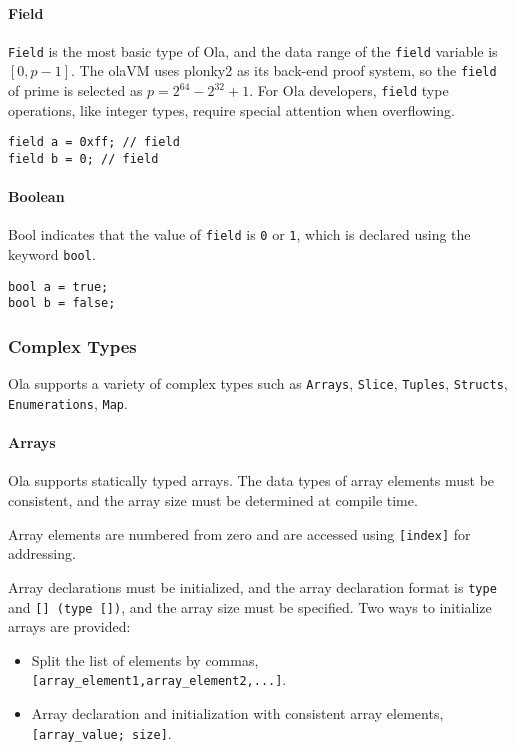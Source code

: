 \paragraph{Field}
\texttt{Field} is the most basic type of Ola, and the data range of the \texttt{field} variable is $[0, p-1]$.
The olaVM uses plonky2 as its back-end proof system, so the \texttt{field} of prime is selected as $p=2^{64}-2^{32}+1$. 
For Ola developers, \texttt{field} type operations, like integer types, require special attention when overflowing.

\begin{lstlisting}
field a = 0xff; // field
field b = 0; // field
\end{lstlisting}

\paragraph{Boolean}

Bool indicates that the value of \texttt{field} is \texttt{0} or \texttt{1}, which is declared using the keyword \texttt{bool}.
\begin{lstlisting}
bool a = true;
bool b = false;
\end{lstlisting}

\subsubsection*{Complex Types}

Ola supports a variety of complex types such as \texttt{Arrays}, \texttt{Slice}, \texttt{Tuples}, \texttt{Structs}, \texttt{Enumerations}, \texttt{Map}.

\paragraph{Arrays}

Ola supports statically typed arrays. The data types of array elements must be consistent, and the array size must be determined at compile time. 

Array elements are numbered from zero and are accessed using \texttt{[index]} for addressing.

Array declarations must be initialized, and the array declaration format is \texttt{type} and \texttt{[] (\texttt{type []})}, and the array size must be specified.
Two ways to initialize arrays are provided:
\begin{itemize}
    \item Split the list of elements by commas, \texttt{[array\_element1,array\_element2,...]}.
    \item Array declaration and initialization with consistent array elements, \texttt{[array\_value; size]}.
\end{itemize}

